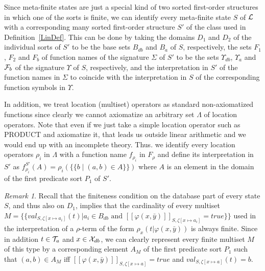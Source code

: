 \documentclass[preprint,11pt]{elsarticle}
\theoremstyle{definition}
\theoremstyle{remark}
\newtheorem{remark}{Remark}
\begin{document}
Since  meta-finite states are just a special kind of two sorted first-order structures in which one of the sorts is finite, we can identify every meta-finite state $S$ of ${\cal L}$ with a corresponding many sorted first-order structure $S'$ of the class used in Definition~\ref{LinDef}. This can be done by taking the domains $D_1$ and $D_2$ of the individual sorts of $S'$ to be the base sets $B_{db}$ and $B_{a}$ of $S$, respectively, the sets $F_1$, $F_2$ and $F_b$ of function names of the signature $\Sigma$ of $S'$ to be the sets $\Upsilon_{db}$, $\Upsilon_a$ and ${\cal F}_b$ of the signature $\Upsilon$ of $S$, respectively, and the interpretation in $S'$ of the function names in $\Sigma$ to coincide with the interpretation in $S$ of the corresponding function symbols in $\Upsilon$.

In addition, we treat location (multiset) operators as standard non-axiomatized functions since clearly we cannot axiomatize an arbitrary set $\Lambda$ of location operators. Note that even if we just take a simple location operator such as $\mathrm{PRODUCT}$ and axiomatize it, that leads us outside linear arithmetic and we would end up with an incomplete theory. Thus. we identify every location operators $\rho_i$ in $\Lambda$ with a function name $f_{\rho_i}$ in $F_\rho$ and define its interpretation in $S'$ as $f^{S'}_{\rho_i}(A) = \rho_i(\{\!\!\{b \mid (a,b) \in A\}\!\!\})$ where $A$ is an element in the domain of the first predicate sort $P_1$ of $S'$.

\begin{remark}
Recall that the finiteness condition on the database part of every state $S$, and thus also on $D_1$,  implies that the cardinality of every multiset
$M = \{\!\!\{val_{S,\zeta[x\mapsto a_i]}(t)| a_i \in B_{db} \text{ and } [\![\varphi(x,\bar{y})]\!]_{S,\zeta[x \mapsto a_i]}=true \}\!\!\}$ used in the interpretation of a $\rho$-term of the form $\rho_{x}(t|\varphi(x,\bar{y}))$ is always finite. Since in addition $t \in {\cal T}_a$ and $x \in {\cal X}_{db}$, we can clearly represent every finite multiset $M$ of this type by a corresponding element $A_M$ of the first predicate sort $P_1$ such that $(a, b) \in A_M$ iff $[\![\varphi(x,\bar{y})]\!]_{S,\zeta[x \mapsto a]}=true$ and $val_{S,\zeta[x\mapsto a]}(t) = b$.
\end{remark}
\end{document}
